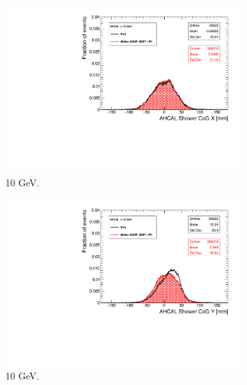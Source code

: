 \begin{figure}[htbp!]
  \centering
  \begin{subfigure}[t]{0.49\textwidth}
    \includegraphics[width=1.\linewidth]{chap5/fig_AHCAL_Timing/Pions/Run24306_CoGX_AHCAL_10GeV_Comparison.pdf}
    \caption{10 GeV.} \label{fig:pi10GeVX}
  \end{subfigure}
  \hfill
  \begin{subfigure}[t]{0.49\textwidth}
    \includegraphics[width=1.\linewidth]{chap5/fig_AHCAL_Timing/Pions/Run24306_CoGY_AHCAL_10GeV_Comparison.pdf}
    \caption{10 GeV.} \label{fig:pi10GeVY}
  \end{subfigure}
  \hfill
  \begin{subfigure}[t]{0.49\textwidth}

\end{subfigure}
\end{figure}

